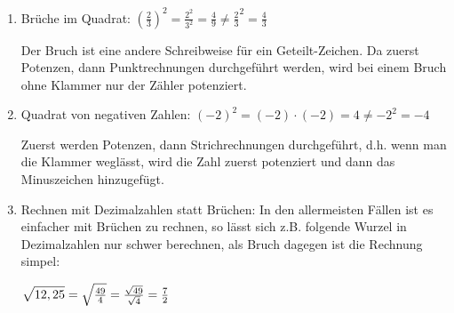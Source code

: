 \newpage
\begin{enumerate}[label=\arabic*)]
	\item Brüche im Quadrat: \(\left(\frac{2}{3}\right) ^2=\frac{2^2}{3^2}=\frac{4}{9}\neq\frac{2}{3}^2=\frac{4}{3}\)

	Der Bruch ist eine andere Schreibweise für ein Geteilt-Zeichen. Da zuerst Potenzen, dann Punktrechnungen durchgeführt werden, wird bei einem Bruch ohne Klammer nur der Zähler potenziert.

	\item Quadrat von negativen Zahlen: \(\left( -2\right) ^2=\left( -2\right) \cdot\left( -2\right) =4\neq-2^2=-4\)

	Zuerst werden Potenzen, dann Strichrechnungen durchgeführt, d.h. wenn man die Klammer weglässt, wird die Zahl zuerst potenziert und dann das Minuszeichen hinzugefügt.

	\item Rechnen mit Dezimalzahlen statt Brüchen: In den allermeisten Fällen ist es einfacher mit Brüchen zu rechnen, so lässt sich z.B. folgende Wurzel in Dezimalzahlen nur schwer berechnen, als Bruch dagegen ist die Rechnung simpel:

	\(\sqrt{12,25\vphantom{A^2}}=\sqrt{\frac{49}{4}}=\frac{\sqrt{49}}{\sqrt{4}}=\frac{7}{2}\)
\end{enumerate}